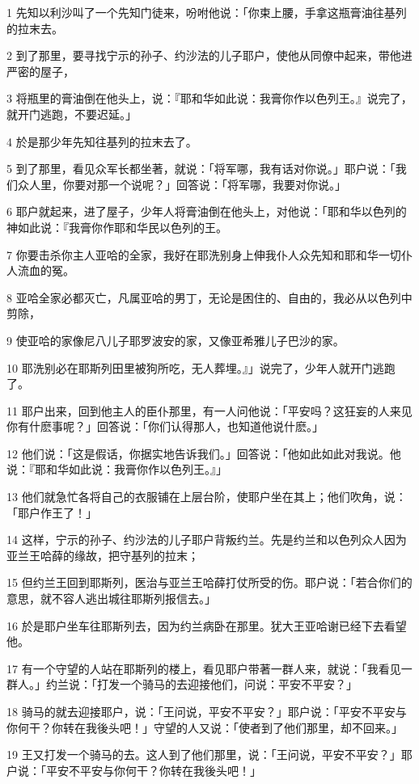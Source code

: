\par 1 先知以利沙叫了一个先知门徒来，吩咐他说：「你束上腰，手拿这瓶膏油往基列的拉末去。
\par 2 到了那里，要寻找宁示的孙子、约沙法的儿子耶户，使他从同僚中起来，带他进严密的屋子，
\par 3 将瓶里的膏油倒在他头上，说：『耶和华如此说：我膏你作以色列王。』说完了，就开门逃跑，不要迟延。」
\par 4 於是那少年先知往基列的拉末去了。
\par 5 到了那里，看见众军长都坐著，就说：「将军哪，我有话对你说。」耶户说：「我们众人里，你要对那一个说呢？」回答说：「将军哪，我要对你说。」
\par 6 耶户就起来，进了屋子，少年人将膏油倒在他头上，对他说：「耶和华以色列的神如此说：『我膏你作耶和华民以色列的王。
\par 7 你要击杀你主人亚哈的全家，我好在耶洗别身上伸我仆人众先知和耶和华一切仆人流血的冤。
\par 8 亚哈全家必都灭亡，凡属亚哈的男丁，无论是困住的、自由的，我必从以色列中剪除，
\par 9 使亚哈的家像尼八儿子耶罗波安的家，又像亚希雅儿子巴沙的家。
\par 10 耶洗别必在耶斯列田里被狗所吃，无人葬埋。』」说完了，少年人就开门逃跑了。
\par 11 耶户出来，回到他主人的臣仆那里，有一人问他说：「平安吗？这狂妄的人来见你有什麽事呢？」回答说：「你们认得那人，也知道他说什麽。」
\par 12 他们说：「这是假话，你据实地告诉我们。」回答说：「他如此如此对我说。他说：『耶和华如此说：我膏你作以色列王。』」
\par 13 他们就急忙各将自己的衣服铺在上层台阶，使耶户坐在其上；他们吹角，说：「耶户作王了！」
\par 14 这样，宁示的孙子、约沙法的儿子耶户背叛约兰。先是约兰和以色列众人因为亚兰王哈薛的缘故，把守基列的拉末；
\par 15 但约兰王回到耶斯列，医治与亚兰王哈薛打仗所受的伤。耶户说：「若合你们的意思，就不容人逃出城往耶斯列报信去。」
\par 16 於是耶户坐车往耶斯列去，因为约兰病卧在那里。犹大王亚哈谢已经下去看望他。
\par 17 有一个守望的人站在耶斯列的楼上，看见耶户带著一群人来，就说：「我看见一群人。」约兰说：「打发一个骑马的去迎接他们，问说：平安不平安？」
\par 18 骑马的就去迎接耶户，说：「王问说，平安不平安？」耶户说：「平安不平安与你何干？你转在我後头吧！」守望的人又说：「使者到了他们那里，却不回来。」
\par 19 王又打发一个骑马的去。这人到了他们那里，说：「王问说，平安不平安？」耶户说：「平安不平安与你何干？你转在我後头吧！」
